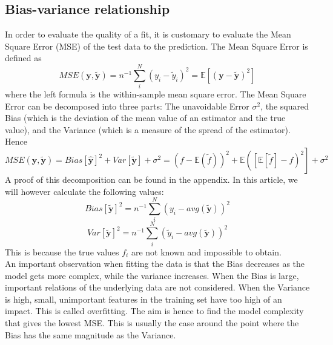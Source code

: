 \documentclass[11pt,a4paper,titlepage]{article}
\begin{document}
\subsection{Bias-variance relationship}
In order to evaluate the quality of a fit, it is customary to evaluate the Mean Square Error (MSE) of the test data to the prediction. The Mean Square Error is defined as
\begin{equation*}
MSE(\bm{y},\bm{\tilde y})=n^{-1}\sum_i^N\left(y_i - \tilde y_i \right)^2=\mathbb{E}\left[(\bm{y}-\bm{\tilde y})^2  \right]
\end{equation*}
where the left formula is the within-sample mean square error.
The Mean Square Error can be decomposed into three parts: The unavoidable Error $\sigma^2$, the squared Bias (which is the deviation of the mean value of an estimator and the true value), and the Variance (which is a measure of the spread of the estimator). Hence
\begin{equation*}
MSE(\bm{y},\bm{\tilde y})=Bias[ \bm{\hat y}]^2 + Var[ \bm{\tilde y}]+\sigma^2= \left(f-\mathbb{E}(\tilde f)\right)^2 + \mathbb{E}\left(\left[\mathbb{E}\left[ \tilde f \right]-f\right)^2 \right]+\sigma^2
\end{equation*}
A proof of this decomposition can be found in the appendix.
In this article, we will however calculate the following values:
\begin{equation*}
Bias[\bm{\tilde y}]^2=n^{-1}\sum_i^N\left( y_i - avg( \bm{\tilde y})\right)^2
\end{equation*}
\begin{equation*}
Var[\bm{\tilde y}]^2=n^{-1}\sum_i^N\left(\tilde y_i - avg( \bm{\tilde y})\right)^2
\end{equation*}
This is because the true values $f_i$ are not known and impossible to obtain.\\
An important observation when fitting the data is that the Bias decreases as the model gets more complex, while the variance increases. When the Bias is large, important relations of the underlying data are not considered. When the Variance is high, small, unimportant features in the training set have too high of an impact. This is called overfitting. The aim is hence to find the model complexity that gives the lowest MSE. This is usually the case around the point where the Bias has the same magnitude as the Variance.
\end{document}
